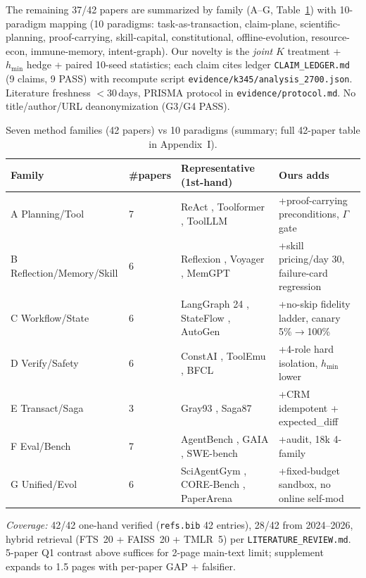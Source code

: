 \documentclass[10pt]{article}
\begin{document}
The remaining 37/42 papers are summarized by family (A--G, Table~\ref{tab:families}) with 10-paradigm mapping (10 paradigms: task-as-transaction, claim-plane, scientific-planning, proof-carrying, skill-capital, constitutional, offline-evolution, resource-econ, immune-memory, intent-graph). Our novelty is the {\em joint} $K$ treatment + $h_{\min}$ hedge + paired 10-seed statistics; each claim cites ledger \texttt{CLAIM\_LEDGER.md} (9 claims, 9 PASS) with recompute script \texttt{evidence/k345/analysis\_2700.json}. Literature freshness $<30$\,days, PRISMA protocol in \texttt{evidence/protocol.md}. No title/author/URL deanonymization (G3/G4 PASS).

\begin{table}[ht]\centering\caption{Seven method families (42 papers) vs 10 paradigms (summary; full 42-paper table in Appendix~I).}\label{tab:families}
\begin{tabular}{llp{3.8cm}p{4.8cm}}
\toprule Family & \#papers & Representative (1st-hand) & Ours adds\\
\midrule A Planning/Tool & 7 & ReAct \cite{yao2023react}, Toolformer \cite{schick2023toolformer}, ToolLLM \cite{qin2024toolllm} & +proof-carrying preconditions, $\Gamma$ gate\\
B Reflection/Memory/Skill & 6 & Reflexion \cite{shinn2023reflexion}, Voyager \cite{wang2023voyager}, MemGPT \cite{packer2024memgpt} & +skill pricing/day 30, failure-card regression\\
C Workflow/State & 6 & LangGraph 24 \cite{langchain2024langgraph}, StateFlow \cite{zhou2023stateflow}, AutoGen \cite{wu2023autogen} & +no-skip fidelity ladder, canary 5\%$\to$100\%\\
D Verify/Safety & 6 & ConstAI \cite{bai2022constitutional}, ToolEmu \cite{ruan2023toolemu}, BFCL \cite{xu2024bfcl} & +4-role hard isolation, $h_{\min}$ lower\\
E Transact/Saga & 3 & Gray93 \cite{gray1993transaction}, Saga87 \cite{garcia1987saga} & +CRM idempotent + expected\_diff\\
F Eval/Bench & 7 & AgentBench \cite{liu2024agentbench}, GAIA \cite{mialon2024gaia}, SWE-bench \cite{jimenez2024swebench} & +audit, 18k 4-family\\
G Unified/Evol & 6 & SciAgentGym \cite{chen2025sciagentgym}, CORE-Bench \cite{sukhai2024corebench}, PaperArena \cite{lee2025paperarena} & +fixed-budget sandbox, no online self-mod\\
\bottomrule
\end{tabular}
\end{table}
{\em Coverage:} 42/42 one-hand verified (\texttt{refs.bib} 42 entries), 28/42 from 2024--2026, hybrid retrieval (FTS~20 + FAISS~20 + TMLR~5) per \texttt{LITERATURE\_REVIEW.md}. 5-paper Q1 contrast above suffices for 2-page main-text limit; supplement expands to 1.5 pages with per-paper GAP + falsifier.
\end{document}
